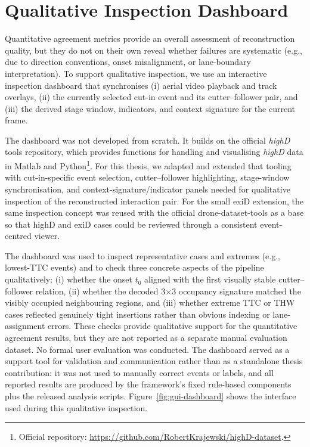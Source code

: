 \documentclass[12pt,a4paper,twoside,openright]{report}
\begin{document}
    \chapter{Qualitative Inspection Dashboard}
    \label{app:dashboard}

    Quantitative agreement metrics provide an overall assessment of reconstruction quality, but they do not on their own reveal whether failures are systematic (e.g., due to direction conventions, onset misalignment, or lane-boundary interpretation). To support qualitative inspection, we use an interactive inspection dashboard that synchronises (i) aerial video playback and track overlays, (ii) the currently selected cut-in event and its cutter--follower pair, and (iii) the derived stage window, indicators, and context signature for the current frame.

    The dashboard was not developed from scratch. It builds on the official \textit{highD} tools repository, which provides functions for handling and visualising \textit{highD} data in Matlab and Python\footnote{Official repository: \url{https://github.com/RobertKrajewski/highD-dataset}.}. For this thesis, we adapted and extended that tooling with cut-in-specific event selection, cutter--follower highlighting, stage-window synchronisation, and context-signature/indicator panels needed for qualitative inspection of the reconstructed interaction pair. For the small exiD extension, the same inspection concept was reused with the official drone-dataset-tools as a base so that highD and exiD cases could be reviewed through a consistent event-centred viewer.

    The dashboard was used to inspect representative cases and extremes (e.g., lowest-TTC events) and to check three concrete aspects of the pipeline qualitatively: (i) whether the onset $t_0$ aligned with the first visually stable cutter--follower relation, (ii) whether the decoded 3$\times$3 occupancy signature matched the visibly occupied neighbouring regions, and (iii) whether extreme TTC or THW cases reflected genuinely tight insertions rather than obvious indexing or lane-assignment errors. These checks provide qualitative support for the quantitative agreement results, but they are not reported as a separate manual evaluation dataset. No formal user evaluation was conducted. The dashboard served as a support tool for validation and communication rather than as a standalone thesis contribution: it was not used to manually correct events or labels, and all reported results are produced by the framework's fixed rule-based components plus the released analysis scripts. Figure~\ref{fig:gui-dashboard} shows the interface used during this qualitative inspection.
\end{document}
